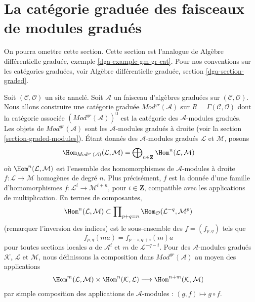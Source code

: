 \section{La catégorie graduée des faisceaux de modules gradués}
\label{section-gm-gr-cat}

\noindent
On pourra omettre cette section. Cette section est
l'analogue de Algèbre différentielle graduée, exemple \ref{dga-example-gm-gr-cat}.
Pour nos conventions sur les catégories graduées,
voir Algèbre différentielle graduée, section \ref{dga-section-graded}.

\medskip\noindent
Soit $(\mathcal{C}, \mathcal{O})$ un site annelé. Soit
$\mathcal{A}$ un faisceau d'algèbres graduées sur
$(\mathcal{C}, \mathcal{O})$. Nous allons construire une
catégorie graduée $\textit{Mod}^{gr}(\mathcal{A})$ sur
$R = \Gamma(\mathcal{C}, \mathcal{O})$ dont
la catégorie associée $(\textit{Mod}^{gr}(\mathcal{A}))^0$ est la
catégorie des $\mathcal{A}$-modules gradués. Les objets de
$\textit{Mod}^{gr}(\mathcal{A})$ sont les
$\mathcal{A}$-modules gradués à droite (voir la section
\ref{section-graded-modules}). Étant donnés des
$\mathcal{A}$-modules gradués $\mathcal{L}$ et $\mathcal{M}$, posons
$$
\Hom_{\textit{Mod}^{gr}(\mathcal{A})}(\mathcal{L}, \mathcal{M}) =
\bigoplus\nolimits_{n \in \mathbf{Z}} \Hom^n(\mathcal{L}, \mathcal{M})
$$
où
$\Hom^n(\mathcal{L}, \mathcal{M})$ est l'ensemble
des homomorphismes de $\mathcal{A}$-modules à droite
$f : \mathcal{L} \to \mathcal{M}$ homogènes
de degré $n$. Plus précisément, $f$ est la donnée d'une
famille d'homomorphismes $f : \mathcal{L}^i \to \mathcal{M}^{i + n}$, pour
$i \in \mathbf{Z}$, compatible avec les applications de multiplication.
En termes de composantes,
$$
\Hom^n(\mathcal{L}, \mathcal{M})
\subset
\prod\nolimits_{p + q = n}
\Hom_\mathcal{O}(\mathcal{L}^{-q}, \mathcal{M}^p)
$$ (remarquer l'inversion
des indices) est le sous-ensemble des
$f = (f_{p, q})$ tels que
$$
f_{p, q}(m a) = f_{p - i, q + i}(m)a
$$ pour toutes sections locales
$a$ de $\mathcal{A}^i$ et
$m$ de $\mathcal{L}^{-q - i}$. Pour des $\mathcal{A}$-modules gradués
$\mathcal{K}$, $\mathcal{L}$ et $\mathcal{M}$, nous définissons la
composition dans $\textit{Mod}^{gr}(\mathcal{A})$ au moyen des
applications
$$
\Hom^m(\mathcal{L}, \mathcal{M}) \times
\Hom^n(\mathcal{K}, \mathcal{L}) \longrightarrow
\Hom^{n + m}(\mathcal{K}, \mathcal{M})
$$ par
simple composition des applications
de $\mathcal{A}$-modules : $(g, f) \mapsto g \circ f$.





